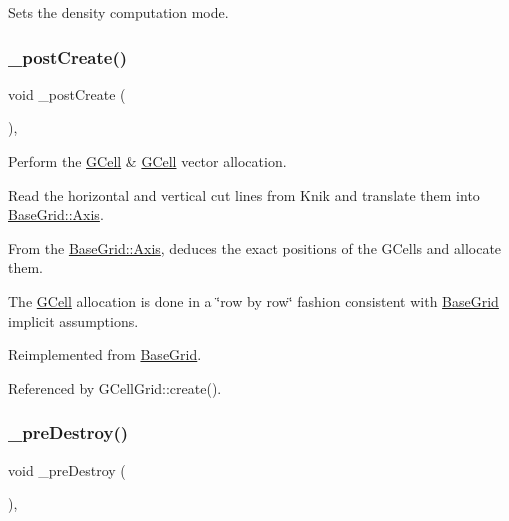 Sets the density computation mode. \mbox{\label{classKatabatic_1_1GCellGrid_a3715b38135ca24745f610bebd3407c10}} 
\subsubsection{\texorpdfstring{\+\_\+post\+Create()}{\_postCreate()}}
{\footnotesize\ttfamily void \+\_\+post\+Create (\begin{DoxyParamCaption}{ }\end{DoxyParamCaption})\hspace{0.3cm}{\ttfamily [protected]}, {\ttfamily [virtual]}}

Perform the \hyperlink{classKatabatic_1_1GCell}{G\+Cell} \& \hyperlink{classKatabatic_1_1GCell}{G\+Cell} vector allocation.
\begin{DoxyItemize}
\item Read the horizontal and vertical cut lines from Knik and translate them into \hyperlink{classKatabatic_1_1BaseGrid_1_1Axis}{Base\+Grid\+::\+Axis}.
\item From the \hyperlink{classKatabatic_1_1BaseGrid_1_1Axis}{Base\+Grid\+::\+Axis}, deduces the exact positions of the G\+Cells and allocate them.
\item The \hyperlink{classKatabatic_1_1GCell}{G\+Cell} allocation is done in a \char`\"{}row by row\char`\"{} fashion consistent with \hyperlink{classKatabatic_1_1BaseGrid}{Base\+Grid} implicit assumptions. 
\end{DoxyItemize}

Reimplemented from \hyperlink{classKatabatic_1_1BaseGrid}{Base\+Grid}.



Referenced by G\+Cell\+Grid\+::create().

\mbox{\label{classKatabatic_1_1GCellGrid_a7c13d9795eafd477994961f8a0d962d0}} 
\subsubsection{\texorpdfstring{\+\_\+pre\+Destroy()}{\_preDestroy()}}
{\footnotesize\ttfamily void \+\_\+pre\+Destroy (\begin{DoxyParamCaption}{ }\end{DoxyParamCaption})\hspace{0.3cm}{\ttfamily [protected]}, {\ttfamily [virtual]}}

